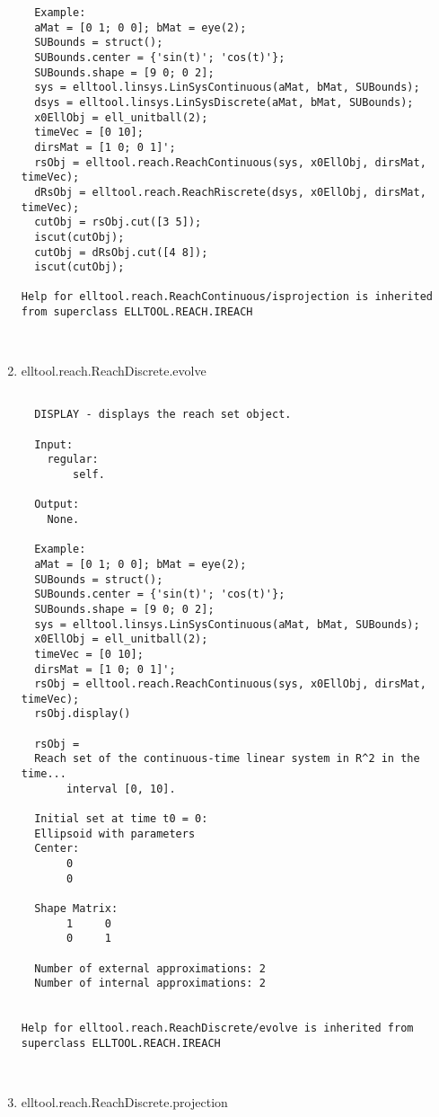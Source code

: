 \begin{enumerate}
\begin{lstlisting}
  Example:
  aMat = [0 1; 0 0]; bMat = eye(2);
  SUBounds = struct();
  SUBounds.center = {'sin(t)'; 'cos(t)'};
  SUBounds.shape = [9 0; 0 2];
  sys = elltool.linsys.LinSysContinuous(aMat, bMat, SUBounds);
  dsys = elltool.linsys.LinSysDiscrete(aMat, bMat, SUBounds);
  x0EllObj = ell_unitball(2);
  timeVec = [0 10];
  dirsMat = [1 0; 0 1]';
  rsObj = elltool.reach.ReachContinuous(sys, x0EllObj, dirsMat, timeVec);
  dRsObj = elltool.reach.ReachRiscrete(dsys, x0EllObj, dirsMat, timeVec);
  cutObj = rsObj.cut([3 5]);
  iscut(cutObj);
  cutObj = dRsObj.cut([4 8]);
  iscut(cutObj);

Help for elltool.reach.ReachContinuous/isprojection is inherited from superclass ELLTOOL.REACH.IREACH



\end{lstlisting}
\fontfamily{\familydefault}
\selectfont
\item {elltool.reach.ReachDiscrete.evolve}
\selectfont
\begin{lstlisting}

  DISPLAY - displays the reach set object.

  Input:
    regular:
        self.

  Output:
    None.

  Example:
  aMat = [0 1; 0 0]; bMat = eye(2);
  SUBounds = struct();
  SUBounds.center = {'sin(t)'; 'cos(t)'};
  SUBounds.shape = [9 0; 0 2];
  sys = elltool.linsys.LinSysContinuous(aMat, bMat, SUBounds);
  x0EllObj = ell_unitball(2);
  timeVec = [0 10];
  dirsMat = [1 0; 0 1]';
  rsObj = elltool.reach.ReachContinuous(sys, x0EllObj, dirsMat, timeVec);
  rsObj.display()

  rsObj =
  Reach set of the continuous-time linear system in R^2 in the time...
       interval [0, 10].

  Initial set at time t0 = 0:
  Ellipsoid with parameters
  Center:
       0
       0

  Shape Matrix:
       1     0
       0     1

  Number of external approximations: 2
  Number of internal approximations: 2


Help for elltool.reach.ReachDiscrete/evolve is inherited from superclass ELLTOOL.REACH.IREACH



\end{lstlisting}
\fontfamily{\familydefault}
\selectfont
\item {elltool.reach.ReachDiscrete.projection}
\selectfont
\begin{lstlisting}


\end{lstlisting}
\end{enumerate}
